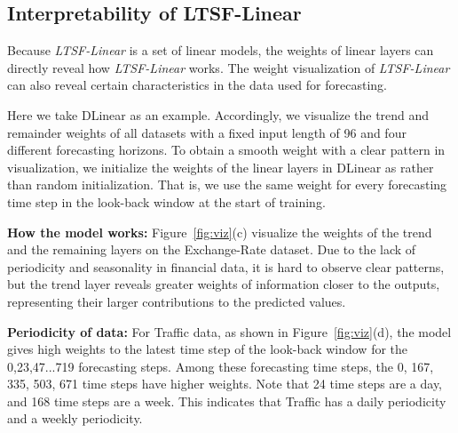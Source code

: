 \documentclass[10pt,twocolumn,letterpaper]{article}
\newcommand{\modelname}{\emph{LTSF-Linear}\xspace}
\begin{document}
\subsection{Interpretability of LTSF-Linear} 
Because \modelname is a set of linear models, the weights of linear layers can directly reveal how \modelname works. The weight visualization of \modelname can also reveal certain characteristics in the data used for forecasting.

Here we take DLinear as an example. Accordingly, we visualize the trend and remainder weights of all datasets with a fixed input length of 96 and four different forecasting horizons. To obtain a smooth weight with a clear pattern in visualization, we initialize the weights of the linear layers in DLinear as  rather than random initialization. That is, we use the same weight for every forecasting time step in the look-back window at the start of training. 

\textbf{How the model works:} Figure~\ref{fig:viz}(c) visualize the weights of the trend and the remaining layers on the Exchange-Rate dataset. Due to the lack of periodicity and seasonality in financial data, it is hard to observe clear patterns, but the trend layer reveals greater weights of information closer to the outputs, representing their larger contributions to the predicted values.

\textbf{Periodicity of data:} For Traffic data, as shown in Figure~\ref{fig:viz}(d), the model gives high weights to the latest time step of the look-back window for the {0,23,47...719} forecasting steps. Among these forecasting time steps, the {0, 167, 335, 503, 671} time steps have higher weights. Note that 24 time steps are a day, and 168 time steps are a week. This indicates that Traffic has a daily periodicity and a weekly periodicity.
\end{document}
